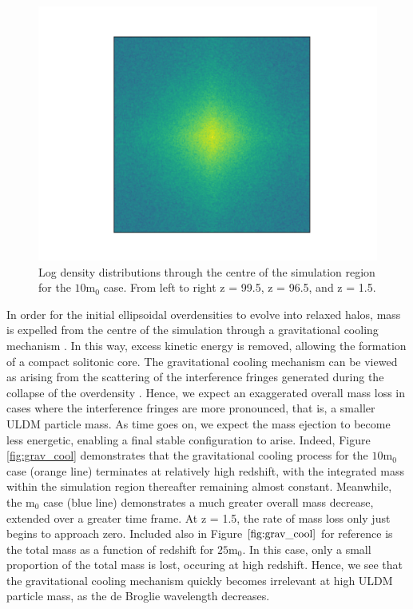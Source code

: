 \documentclass[a4paper,11pt]{article}
\begin{document}
\begin{figure}[!htb]
  \includegraphics[trim={3cm 0 0 0},scale=0.5]{single_mid_plane_107.png}
\endminipage
\caption{Log density distributions through the centre of the simulation region for the $10 \mathrm{m}_0$ case. From left to right z = 99.5, z = 96.5, and z = 1.5.}\label{fig:contours_mid}
\end{figure}


In order for the initial ellipsoidal overdensities to evolve into relaxed halos, mass is expelled from the centre of the simulation through a gravitational cooling mechanism \cite{Seidel:1993zk, Guzman:2006yc}. In this way, excess kinetic energy is removed, allowing the formation of a compact solitonic core. The gravitational cooling mechanism can be viewed as arising from the scattering of the interference fringes generated during the collapse of the overdensity \cite{Arvanitaki:2019rax}. Hence, we expect an exaggerated overall mass loss in cases where the interference fringes are more pronounced, that is, a smaller ULDM particle mass. As time goes on, we expect the mass ejection to become less energetic, enabling a final stable configuration to arise. Indeed, Figure \ref{fig:grav_cool} demonstrates that the gravitational cooling process for the $\mathrm{10m}_0$ case (orange line) terminates at relatively high redshift, with the integrated mass within the simulation region thereafter remaining almost constant. Meanwhile, the $\mathrm{m}_0$ case (blue line) demonstrates a much greater overall mass decrease, extended over a greater time frame. At z = 1.5, the rate of mass loss only just begins to approach zero. Included also in Figure $\ref{fig:grav_cool}$ for reference is the total mass as a function of redshift for $\mathrm{25m}_0$. In this case, only a small proportion of the total mass is lost, occuring at high redshift. Hence, we see that the gravitational cooling mechanism quickly becomes irrelevant at high ULDM particle mass, as the de Broglie wavelength decreases. 
\end{document}
